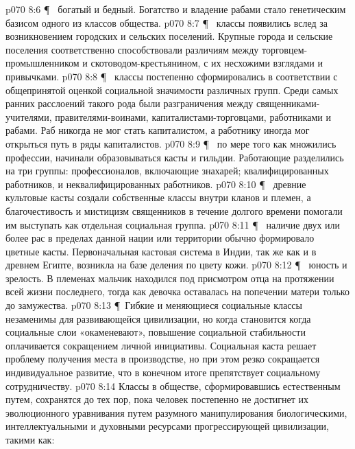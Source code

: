 \vs p070 8:6 \P\ \bibnobreakspace {} богатый и бедный. Богатство и владение рабами стало генетическим базисом одного из классов общества.
\vs p070 8:7 \P\ \bibnobreakspace {} классы появились вслед за возникновением городских и сельских поселений. Крупные города и сельские поселения соответственно способствовали различиям между торговцем\hyp{}промышленником и скотоводом\hyp{}крестьянином, с их несхожими взглядами и привычками.
\vs p070 8:8 \P\ \bibnobreakspace {} классы постепенно сформировались в соответствии с общепринятой оценкой социальной значимости различных групп. Среди самых ранних расслоений такого рода были разграничения между священниками\hyp{}учителями, правителями\hyp{}воинами, капиталистами\hyp{}торговцами, работниками и рабами. Раб никогда не мог стать капиталистом, а работнику иногда мог открыться путь в ряды капиталистов.
\vs p070 8:9 \P\ \bibnobreakspace {} по мере того как множились профессии, начинали образовываться касты и гильдии. Работающие разделились на три группы: профессионалов, включающие знахарей; квалифицированных работников, и неквалифицированных работников.
\vs p070 8:10 \P\ \bibnobreakspace {} древние культовые касты создали собственные классы внутри кланов и племен, а благочестивость и мистицизм священников в течение долгого времени помогали им выступать как отдельная социальная группа.
\vs p070 8:11 \P\ \bibnobreakspace {} наличие двух или более рас в пределах данной нации или территории обычно формировало цветные касты. Первоначальная кастовая система в Индии, так же как и в древнем Египте, возникла на базе деления по цвету кожи.
\vs p070 8:12 \P\ \bibnobreakspace {} юность и зрелость. В племенах мальчик находился под присмотром отца на протяжении всей жизни последнего, тогда как девочка оставалась на попечении матери только до замужества.
\vs p070 8:13 \P\ Гибкие и меняющиеся социальные классы незаменимы для развивающейся цивилизации, но когда  становится  когда социальные слои «окаменевают», повышение социальной стабильности оплачивается сокращением личной инициативы. Социальная каста решает проблему получения места в производстве, но при этом резко сокращается индивидуальное развитие, что в конечном итоге препятствует социальному сотрудничеству.
\vs p070 8:14 Классы в обществе, сформировавшись естественным путем, сохранятся до тех пор, пока человек постепенно не достигнет их эволюционного уравнивания путем разумного манипулирования биологическими, интеллектуальными и духовными ресурсами прогрессирующей цивилизации, такими как:
